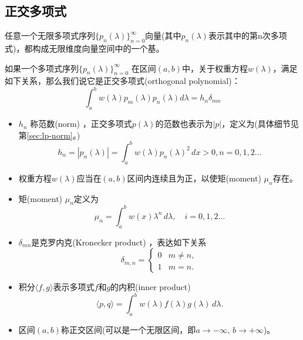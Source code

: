 \begin{subappendices}
\subsection{正交多项式}
\label{sec:orthogonality-polynomials}
任意一个无限多项式序列$\{p_{n}(\lambda)\}_{n=0}^{\infty}$向量(其中$p_{n}(\lambda)$表示其中的第n次多项式)，都构成无限维度向量空间中的一个基。
\begin{definition}[正交多项式]
  如果一个多项式序列$\{p_n(\lambda)\}_{n=0}^{\infty}$ 在区间$(a,b)$中，关于权重方程$w(\lambda)$，满足如下关系，那么我们说它是正交多项式(orthogonal polynomial)：
  \begin{equation}
    \label{eq:poly-orthogonal-poly-def}
    \int_a^b w(\lambda) p_m(\lambda) p_n(\lambda) d \lambda = h_n \delta_{mn}
  \end{equation}
\end{definition}
  \begin{itemize}
    \item $h_n$ 称范数(norm)  ，正交多项式$p(\lambda)$的范数也表示为$\left| p \right|$，定义为(具体细节见第\ref{sec:lp-norm}。)
    \begin{equation}
      \label{eq:poly-norm-def}
      h_n = \left| p_{n}(\lambda) \right| = \int_a^b w(\lambda) p_n(\lambda)^2 \, d x >0, n=0,1,2\ldots
    \end{equation}
    \item 权重方程$w(\lambda)$应当在$(a,b)$区间内连续且为正，以使矩(moment) $\mu_n$存在。
    \item 矩(moment) $\mu_n$定义为
    \begin{equation}
    \label{eq:poly-moment-def}
    \mu_n = \int_a^b w(x) \lambda^n \, d \lambda, \quad i=0,1,2\ldots
  \end{equation}
    \item $\delta_{mn}$是克罗内克(Kronecker product) ，表达如下关系
    \begin{equation}
      \label{eq:poly-kronecker}
      \delta_{m,n} = \begin{cases}
      0 & m \neq n, \\
      1 & m=n.
      \end{cases}
    \end{equation}
    \item 积分$\langle f, g \rangle$表示多项式$f$和$g$的内积(inner product)
    \begin{equation}
      \label{eq:poly-inner-product-def}
      \langle p,q \rangle =
      \int_a^b w(\lambda) f(\lambda) g(\lambda) \, d \lambda.
    \end{equation}
    \item 区间$(a,b)$称正交区间(可以是一个无限区间，即$a \rightarrow -\infty, \, b \rightarrow +\infty$)。
  \end{itemize}


\end{subappendices}
